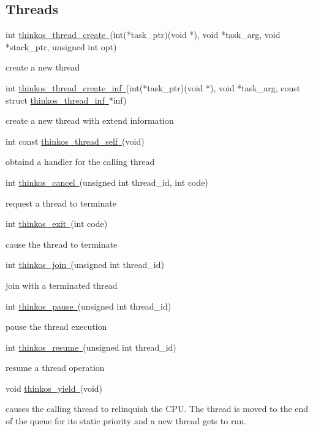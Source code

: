 
\subsection{\texorpdfstring{{Threads}}{Threads}}\label{threads}

{int
}{\protect\hyperlink{h.1fob9te}{thinkos\_thread\_create}}{\protect\hyperlink{h.1fob9te}{~}}{(int(*task\_ptr)(void
*), void *task\_arg, void *stack\_ptr, unsigned int opt)}

{create a new thread }

{int
}{\protect\hyperlink{h.3znysh7}{thinkos\_thread\_create\_inf}}{\protect\hyperlink{h.3znysh7}{~}}{(int(*task\_ptr)(void
*), void *task\_arg, const struct
}{\protect\hyperlink{h.2iq8gzs}{thinkos\_thread\_inf}}{\protect\hyperlink{h.2iq8gzs}{~}}{*inf)}

{create a new thread with extend information }

{int const
}{\protect\hyperlink{h.2et92p0}{thinkos\_thread\_self}}{\protect\hyperlink{h.2et92p0}{~}}{(void)}

{obtaind a handler for the calling thread }

{int
}{\protect\hyperlink{h.tyjcwt}{thinkos\_cancel}}{\protect\hyperlink{h.tyjcwt}{~}}{(unsigned
int thread\_id, int code)}

{request a thread to terminate }

{int
}{\protect\hyperlink{h.3dy6vkm}{thinkos\_exit}}{\protect\hyperlink{h.3dy6vkm}{~}}{(int
code)}

{cause the thread to terminate }

{int
}{\protect\hyperlink{h.1t3h5sf}{thinkos\_join}}{\protect\hyperlink{h.1t3h5sf}{~}}{(unsigned
int thread\_id)}

{join with a terminated thread }

{int
}{\protect\hyperlink{h.4d34og8}{thinkos\_pause}}{\protect\hyperlink{h.4d34og8}{~}}{(unsigned
int thread\_id)}

{pause the thread execution }

{int
}{\protect\hyperlink{h.2s8eyo1}{thinkos\_resume}}{\protect\hyperlink{h.2s8eyo1}{~}}{(unsigned
int thread\_id)}

{resume a thread operation }

{void
}{\protect\hyperlink{h.17dp8vu}{thinkos\_yield}}{\protect\hyperlink{h.17dp8vu}{~}}{(void)}

{causes the calling thread to relinquish the CPU. The thread is moved to
the end of the queue for its static priority and a new thread gets to
run. }

